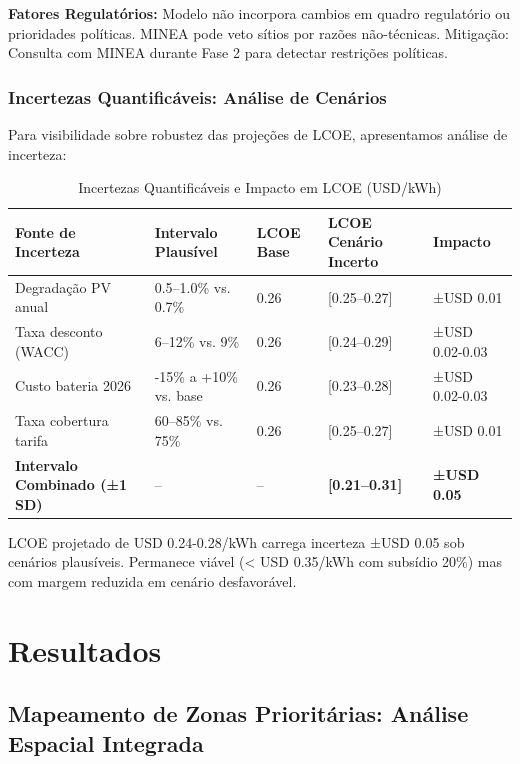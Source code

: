\documentclass[12pt, a4paper]{article}
\begin{document}
{{{{{{{{{{{{\textbf{Fatores Regulatórios:} Modelo não incorpora cambios em quadro regulatório ou prioridades políticas. MINEA pode veto sítios por razões não-técnicas. Mitigação: Consulta com MINEA durante Fase 2 para detectar restrições políticas.

\subsubsection{Incertezas Quantificáveis: Análise de Cenários}

Para visibilidade sobre robustez das projeções de LCOE, apresentamos análise de incerteza:

\begin{table}[H]
\centering
\caption{Incertezas Quantificáveis e Impacto em LCOE (USD/kWh)}
\label{tab:lcoe_uncertainty}
\footnotesize
\begin{tabular}{|l|l|l|l|l|}
\hline
\textbf{Fonte de Incerteza} & \textbf{Intervalo Plausível} & \textbf{LCOE Base} & \textbf{LCOE Cenário Incerto} & \textbf{Impacto} \\
\hline
Degradação PV anual & 0.5--1.0\% vs. 0.7\% & 0.26 & [0.25--0.27] & ±USD 0.01 \\
\hline
Taxa desconto (WACC) & 6--12\% vs. 9\% & 0.26 & [0.24--0.29] & ±USD 0.02-0.03 \\
\hline
Custo bateria 2026 & -15\% a +10\% vs. base & 0.26 & [0.23--0.28] & ±USD 0.02-0.03 \\
\hline
Taxa cobertura tarifa & 60--85\% vs. 75\% & 0.26 & [0.25--0.27] & ±USD 0.01 \\
\hline
\textbf{Intervalo Combinado (±1 SD)} & -- & -- & \textbf{[0.21--0.31]} & \textbf{±USD 0.05} \\
\hline
\end{tabular}
\end{table}

LCOE projetado de USD 0.24-0.28/kWh carrega incerteza ±USD 0.05 sob cenários plausíveis. Permanece viável (< USD 0.35/kWh com subsídio 20\%) mas com margem reduzida em cenário desfavorável.

\section{Resultados}

\subsection{Mapeamento de Zonas Prioritárias: Análise Espacial Integrada}

}}}}}}}}}}}}
\end{document}
